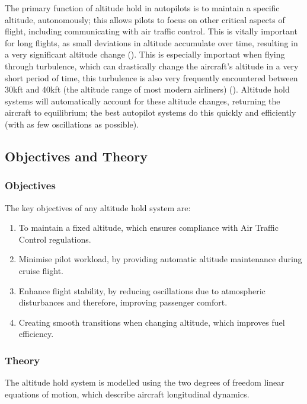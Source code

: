 \documentclass[stu, a4paper, 12pt, floatsintext]{apa7}
\numberwithin{figure}{section}
\numberwithin{table}{section}
\numberwithin{equation}{section}
\begin{document}
The primary function of altitude hold in autopilots is to maintain a specific altitude, autonomously; this allows pilots to focus on other critical aspects of flight, including communicating with air traffic control. This is vitally important for long flights, as small deviations in altitude accumulate over time, resulting in a very significant altitude change (\cite{nasa2017}). This is especially important when flying through turbulence, which can drastically change the aircraft’s altitude in a very short period of time, this turbulence is also very frequently encountered between 30kft and 40kft (the altitude range of most modern airliners) (\cite{nasa2017}). Altitude hold systems will automatically account for these altitude changes, returning the aircraft to equilibrium; the best autopilot systems do this quickly and efficiently (with as few oscillations as possible).

\newpage

\subsection{Objectives and Theory}

\subsubsection{Objectives}
The key objectives of any altitude hold system are: 
\begin{enumerate}
    \item To maintain a fixed altitude, which ensures compliance with Air Traffic Control regulations.
    \item Minimise pilot workload, by providing automatic altitude maintenance during cruise flight.
    \item Enhance flight stability, by reducing oscillations due to atmospheric disturbances and therefore, improving passenger comfort.
    \item Creating smooth transitions when changing altitude, which improves fuel efficiency. 
\end{enumerate}

\subsubsection{Theory}

The altitude hold system is modelled using the two degrees of freedom linear equations of motion, which describe aircraft longitudinal dynamics.
\end{document}

